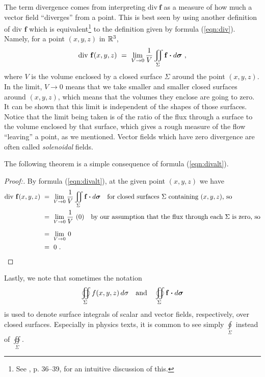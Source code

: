 The term divergence comes from interpreting $\text{div}~\mathbf{f}$ as a measure of how much a vector field ``diverges''
from a point. 
This is best seen by using another definition of div $\mathbf{f}$ which is
equivalent\footnote{See \cite{sch}, p. 36--39, for an intuitive discussion of this.} to the definition given by
formula (\ref{eqn:div}). Namely, for a point $(x,y,z)$ in $\mathbb{R}^{3}$,
\begin{equation}\label{eqn:divalt}
 \text{div}~\mathbf{f}(x,y,z) ~=~ \lim_{V \to 0} \frac{1}{V} \iint\limits_{\Sigma} \mathbf{f} \bm{\cdot} d\bm{\sigma} ~,
\end{equation}
where $V$ is the volume enclosed by a closed surface $\Sigma$ around the point $(x,y,z)$. In the limit, $V \to 0$ means
that we take smaller and smaller closed surfaces around $(x,y,z)$, which means that the volumes they enclose are going
to zero. It can be shown that this limit is independent of the shapes of those surfaces. Notice that the limit being
taken is of the ratio of the flux through a surface to the volume enclosed by that surface, which gives a rough
measure of the flow ``leaving'' a point, as we mentioned. Vector fields which have zero divergence are
often called \emph{solenoidal} fields.

The following theorem is a simple consequence of formula (\ref{eqn:divalt}).

\begin{proofbar}\begin{proof}[Proof:]
 By formula (\ref{eqn:divalt}), at the given point $(x,y,z)$ we have 
 \begin{align*}
  \text{div}~\mathbf{f}(x,y,z) ~&=~ \lim_{V \to 0} \frac{1}{V} \iint\limits_{\Sigma} \Dotprod{\mathbf{f}}{d\bm{\sigma}}
   ~~~\text{for closed surfaces $\Sigma$ containing $(x,y,z)$, so}\\
    &=~ \lim_{V \to 0} \frac{1}{V} \,\, (0) ~~~\text{by our assumption that the flux through each $\Sigma$ is
    zero, so}\\[6pt]
    &=~ \lim_{V \to 0} \, 0\\
    &=~ 0 ~.\hfill\qedhere
 \end{align*}
\end{proof}\end{proofbar}

Lastly, we note that sometimes the notation
\begin{displaymath}
 \oiint\limits_{\Sigma} f(x,y,z)\,d\sigma \quad\text{and}\quad \oiint\limits_{\Sigma} \mathbf{f} \bm{\cdot} d\bm{\sigma}
\end{displaymath}
is used to denote surface integrals of scalar and vector fields, respectively, over closed
surfaces.\index{$\oiint\limits_{\Sigma}$} Especially in physics texts, it is common to see simply
$\oint\limits_{\Sigma}$ instead of $\oiint\limits_{\Sigma}$.

